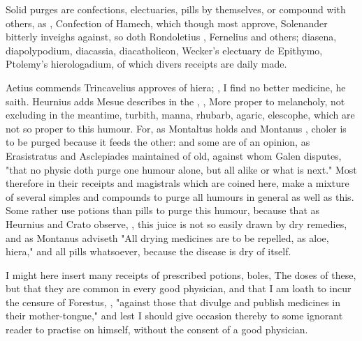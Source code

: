 {Solid purges are confections, electuaries, pills by themselves, or compound with others, as , \etc{} Confection of Hamech, which though most approve, Solenander  bitterly inveighs against, so doth Rondoletius , Fernelius and others; diasena, diapolypodium, diacassia, diacatholicon, Wecker's electuary de Epithymo, Ptolemy's hierologadium, of which divers receipts are daily made.

Aetius  commends  Trincavelius  approves of hiera; , I find no better medicine, he saith. Heurnius adds  Mesue describes in the , , \etc{} More proper to melancholy, not excluding in the meantime, turbith, manna, rhubarb, agaric, elescophe, \etc{} which are not so proper to this humour. For, as Montaltus holds  and Montanus , choler is to be purged because it feeds the other: and some are of an opinion, as Erasistratus and Asclepiades maintained of old, against whom Galen disputes, "that no physic doth purge one humour alone, but all alike or what is next." Most therefore in their receipts and magistrals which are coined here, make a mixture of several simples and compounds to purge all humours in general as well as this. Some rather use potions than pills to purge this humour, because that as Heurnius and Crato observe, , this juice is not so easily drawn by dry remedies, and as Montanus adviseth  "All drying medicines are to be repelled, as aloe, hiera," and all pills whatsoever, because the disease is dry of itself.

I might here insert many receipts of prescribed potions, boles, \etc{} The doses of these, but that they are common in every good physician, and that I am loath to incur the censure of Forestus, , "against those that divulge and publish medicines in their mother-tongue," and lest I should give occasion thereby to some ignorant reader to practise on himself, without the consent of a good physician.

}
